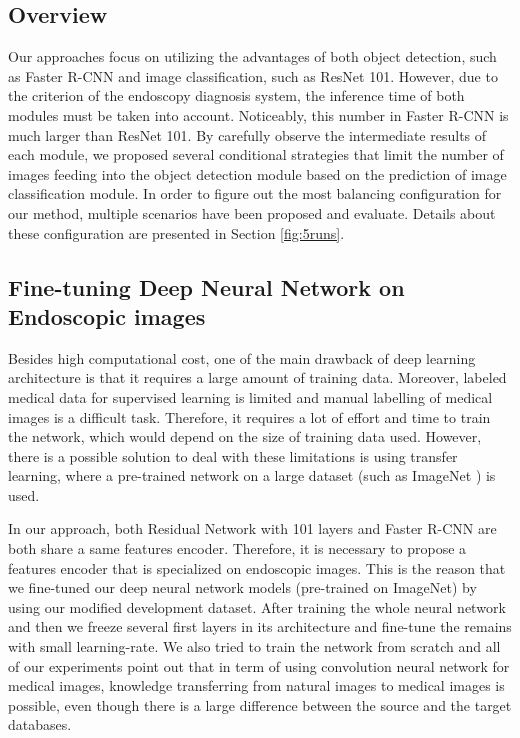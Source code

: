 \subsection{Overview}
Our approaches focus on utilizing the advantages of both object detection, such as Faster R-CNN and image classification, such as ResNet 101. However, due to the criterion of the endoscopy diagnosis system, the inference time of both modules must be taken into account. Noticeably, this number in Faster R-CNN is much larger than ResNet 101. By carefully observe the intermediate results of each module, we proposed several conditional strategies that limit the number of images feeding into the object detection module based on the  prediction  of image classification  module. In order to figure out the most balancing configuration for our method, multiple scenarios have been proposed and evaluate. Details about these configuration are presented in Section \ref{fig:5runs}.

\subsection{Fine-tuning Deep Neural Network on Endoscopic images}
Besides high computational cost, one of the main drawback of deep learning architecture is that it requires a large amount of training data. Moreover, labeled medical data
for supervised learning is limited and manual labelling of medical images is a difficult task. Therefore, it requires a lot of effort and time to train the network, which would depend on the size of training data used. However, there is a possible solution to deal with these limitations is
using transfer learning, where a pre-trained network on a large dataset (such as ImageNet \cite{ImageNet}) is used. 

In our approach, both Residual Network with 101 layers and Faster R-CNN \cite{chen17implementation} are both share a same features encoder. Therefore, it is necessary to propose a features encoder that is specialized on endoscopic images. This is the reason that we fine-tuned our deep neural network models (pre-trained on ImageNet) by using our modified development dataset. After training the whole neural network and then we freeze several first layers in its architecture and fine-tune the remains with small learning-rate. We also tried to train the network from scratch and all of our experiments point out that in term of using convolution neural network for medical images, knowledge transferring from natural images to medical images is possible, even though there is a large difference between the source and the target databases. 


